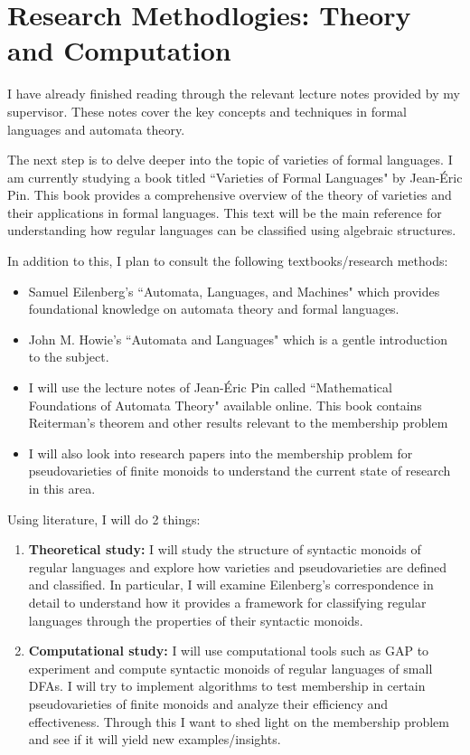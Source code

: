 \section{Research Methodlogies: Theory and Computation}
I have already finished reading through the relevant lecture notes provided by my supervisor. These notes cover the key concepts and techniques in formal languages and automata theory.

The next step is to delve deeper into the topic of varieties of formal languages. I am currently studying a book titled ``Varieties of Formal Languages" by Jean-Éric Pin. This book provides a comprehensive overview of the theory of varieties and their applications in formal languages.
This text will be the main reference for understanding how regular languages can be classified using algebraic structures.

In addition to this, I plan to consult the following textbooks/research methods:
\begin{itemize}
    \item Samuel Eilenberg's ``Automata, Languages, and Machines" \cite{EilenbergSamuel1974Alam} which provides foundational knowledge on automata theory and formal languages.
    \item John M. Howie's ``Automata and Languages" \cite{alma9943532370001381} which is a gentle introduction to the subject.
    \item I will use the lecture notes of Jean-Éric Pin called ``Mathematical Foundations of Automata Theory" \cite{Pin2025} available online. This book contains Reiterman's theorem and other results relevant to the membership problem
    \item I will also look into research papers into the membership problem for pseudovarieties of finite monoids to understand the current state of research in this area.
\end{itemize}

Using literature, I will do 2 things:

\begin{enumerate}
    \item {\bf Theoretical study:} I will study the structure of syntactic monoids of regular languages and explore how varieties and pseudovarieties are defined and classified. In particular, I will examine Eilenberg’s correspondence in detail to understand how it provides a framework for classifying regular languages through the properties of their syntactic monoids.
    \item {\bf Computational study:} I will use computational tools such as GAP \cite{GAP4} to experiment and compute syntactic monoids of regular languages of small DFAs. I will try to implement algorithms to test membership in certain pseudovarieties of finite monoids and analyze their efficiency and effectiveness. Through this I want to shed light on the membership problem and see if it will yield new examples/insights.
\end{enumerate}

